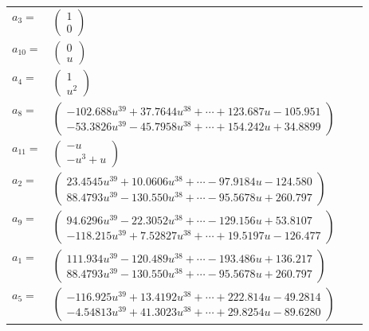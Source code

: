 \documentclass[1p]{elsarticle_modified}
\theoremstyle{definition}
\begin{document}
\begin{tabular}{m{7pt} m{180pt} m{7pt} m{180pt} }
\flushright $a_{3}=$&$\begin{pmatrix}1\\0\end{pmatrix}$ \\
\flushright $a_{10}=$&$\begin{pmatrix}0\\u\end{pmatrix}$ \\
\flushright $a_{4}=$&$\begin{pmatrix}1\\u^2\end{pmatrix}$ \\
\flushright $a_{8}=$&$\begin{pmatrix}-102.688 u^{39}+37.7644 u^{38}+\cdots+123.687 u-105.951\\-53.3826 u^{39}-45.7958 u^{38}+\cdots+154.242 u+34.8899\end{pmatrix}$ \\
\flushright $a_{11}=$&$\begin{pmatrix}- u\\- u^3+u\end{pmatrix}$ \\
\flushright $a_{2}=$&$\begin{pmatrix}23.4545 u^{39}+10.0606 u^{38}+\cdots-97.9184 u-124.580\\88.4793 u^{39}-130.550 u^{38}+\cdots-95.5678 u+260.797\end{pmatrix}$ \\
\flushright $a_{9}=$&$\begin{pmatrix}94.6296 u^{39}-22.3052 u^{38}+\cdots-129.156 u+53.8107\\-118.215 u^{39}+7.52827 u^{38}+\cdots+19.5197 u-126.477\end{pmatrix}$ \\
\flushright $a_{1}=$&$\begin{pmatrix}111.934 u^{39}-120.489 u^{38}+\cdots-193.486 u+136.217\\88.4793 u^{39}-130.550 u^{38}+\cdots-95.5678 u+260.797\end{pmatrix}$ \\
\flushright $a_{5}=$&$\begin{pmatrix}-116.925 u^{39}+13.4192 u^{38}+\cdots+222.814 u-49.2814\\-4.54813 u^{39}+41.3023 u^{38}+\cdots+29.8254 u-89.6280\end{pmatrix}$ \\

\end{tabular}
\end{document}
